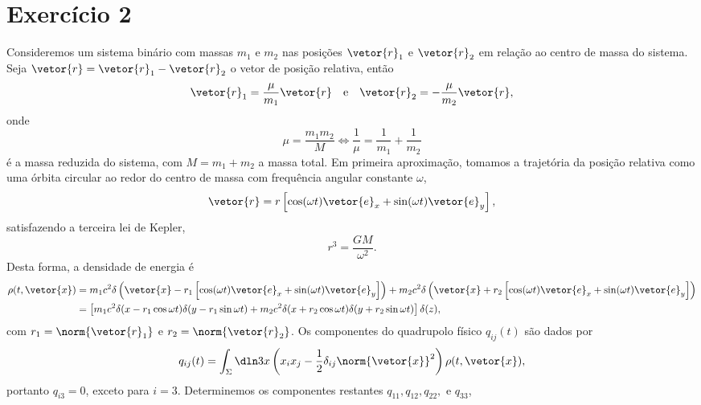 \section*{Exercício 2}
Consideremos um sistema binário com massas \(m_1\) e \(m_2\) nas posições \(\vetor{r}_1\) e \(\vetor{r}_2\) em relação ao centro de massa do sistema. Seja \(\vetor{r} = \vetor{r}_1 - \vetor{r}_2\) o vetor de posição relativa, então
\begin{equation*}
    \vetor{r}_1 = \frac{\mu}{m_1}\vetor{r}\quad\text{e}\quad \vetor{r}_2 =-\frac{\mu}{m_2}\vetor{r},
\end{equation*}
onde
\begin{equation*}
    \mu = \frac{m_1m_2}{M} \iff \frac{1}\mu = \frac{1}{m_1} + \frac{1}{m_2}
\end{equation*}
é a massa reduzida do sistema, com \(M = m_1 + m_2\) a massa total. Em primeira aproximação, tomamos a trajetória da posição relativa como uma órbita circular ao redor do centro de massa com frequência angular constante \(\omega\),
\begin{equation*}
    \vetor{r} = r \left[\cos(\omega t) \vetor{e}_x + \sin(\omega t)\vetor{e}_y\right],
\end{equation*}
satisfazendo a terceira lei de Kepler,
\begin{equation*}
    r^3 = \frac{GM}{\omega^2}.
\end{equation*}
Desta forma, a densidade de energia é
\begin{align*}
    \rho(t, \vetor{x}) &= m_1c^2\delta\left(\vetor{x} - r_1\left[\cos(\omega t) \vetor{e}_x + \sin(\omega t)\vetor{e}_y\right]\right) + m_2c^2 \delta\left(\vetor{x} + r_2\left[\cos(\omega t) \vetor{e}_x + \sin(\omega t)\vetor{e}_y\right]\right)\\
                       &= \left[m_1c^2 \delta(x - r_1 \cos\omega t)\delta(y - r_1\sin\omega t) + m_2c^2 \delta(x + r_2 \cos\omega t)\delta(y + r_2 \sin\omega t)\right]\delta(z),
\end{align*}
com \(r_1 = \norm{\vetor{r}_1}\) e \(r_2 = \norm{\vetor{r}_2}\). Os componentes do quadrupolo físico \(q_{ij}(t)\) são dados por
\begin{equation*}
    q_{ij}(t) = \int_{\Sigma} \dln3x\left(x_ix_j - \frac12 \delta_{ij}\norm{\vetor{x}}^2\right)\rho(t, \vetor{x}),
\end{equation*}
portanto \(q_{i3} = 0\), exceto para \(i = 3\). Determinemos os componentes restantes \(q_{11}, q_{12}, q_{22},\) e \(q_{33}\),
